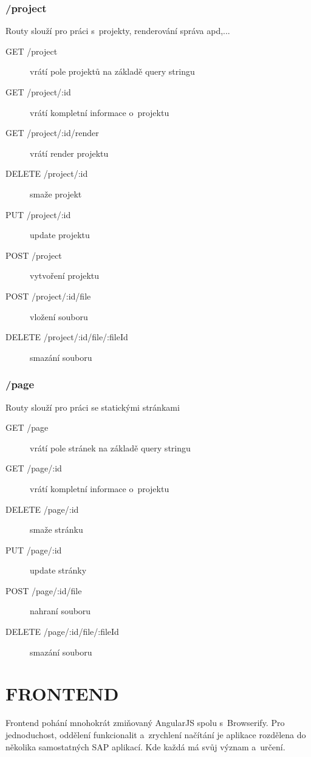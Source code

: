 \documentclass[a4paper,12pt,twoside,BCOR=10mm]{article}
\newcommand{\upc}[1]{\uppercase{#1}} %
\begin{document}
\subsubsection{/project}
Routy slouží pro práci s~projekty, renderování správa apd,...
\begin{description}
\item[GET /project] vrátí pole projektů na základě query stringu
\item[GET /project/:id] vrátí kompletní informace o~projektu
\item[GET /project/:id/render] vrátí render projektu
\item[DELETE /project/:id] smaže projekt
\item[PUT /project/:id] update projektu
\item[POST /project] vytvoření projektu
\item[POST /project/:id/file] vložení souboru
\item[DELETE /project/:id/file/:fileId] smazání souboru
\end{description}

\subsubsection{/page}
Routy slouží pro práci se statickými stránkami
\begin{description}
\item[GET /page] vrátí pole stránek na základě query stringu
\item[GET /page/:id] vrátí kompletní informace o~projektu
\item[DELETE /page/:id] smaže stránku
\item[PUT /page/:id] update stránky
\item[POST /page/:id/file] nahraní souboru
\item[DELETE /page/:id/file/:fileId] smazání souboru
\end{description}

\section{\upc{Frontend}}\label{sec:frontend}
Frontend pohání mnohokrát zmiňovaný AngularJS spolu s~Browserify. Pro jednoduchost, oddělení funkcionalit a~zrychlení načítání je aplikace rozdělena do několika samostatných SAP aplikací. Kde každá má svůj význam a~určení.
\end{document}
